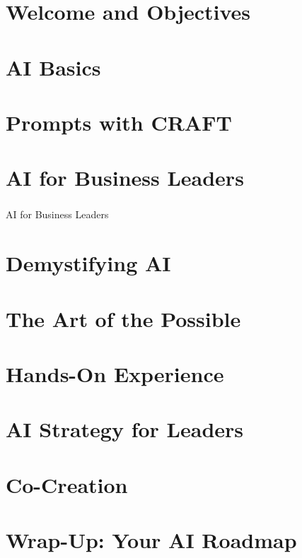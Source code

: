 
\section[Welcome]{Welcome and Objectives}


\section[Core]{AI Basics}



\section[Prompts]{Prompts with CRAFT}


\section[BizLeaders]{AI for Business Leaders}
\begin{frame}[fragile]\frametitle{}
\begin{center}
{\Large AI for Business Leaders}
\end{center}
\end{frame}

\section[Demystify]{Demystifying AI}


\section[Possible]{The Art of the Possible}


\section[HandsOn]{Hands-On Experience}


\section[Strategy]{AI Strategy for Leaders}


\section[CoCreate]{Co-Creation}


\section[WrapUp]{Wrap-Up: Your AI Roadmap}

